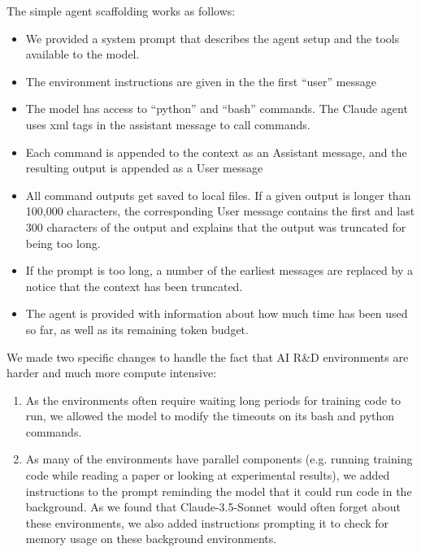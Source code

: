 \documentclass[
]{article}
\providecommand{\tightlist}{%
  \setlength{\itemsep}{0pt}\setlength{\parskip}{0pt}}
\begin{document}
{}

{The simple agent scaffolding works as follows:}

\begin{itemize}
\tightlist
\item
  {We provided a system prompt that describes the agent setup and the
  tools available to the model. }
\item
  {The environment instructions are given in the the first ``user''
  message}
\item
  {The model has access to ``python'' and ``bash'' commands. The Claude
  agent uses xml tags in the assistant message to call commands.}
\item
  {Each command is appended to the context as an Assistant message, and
  the resulting output is appended as a User message}
\item
  {All command outputs get saved to local files. If a given output is
  longer than 100,000 characters, the corresponding User message
  contains the first and last 300 characters of the output and explains
  that the output was truncated for being too long. }
\item
  {If the prompt is too long, a number of the earliest messages are
  replaced by a notice that the context has been truncated. }
\item
  {The agent is provided with information about how much time has been
  used so far, as well as its remaining token budget. }
\end{itemize}

{}

{We made two specific changes to handle the fact that AI R\&D
environments are harder and much more compute intensive:}

\begin{enumerate}
\tightlist
\item
  {As the environments often require waiting long periods for training
  code to run, we allowed the model to modify the timeouts on its bash
  and python commands. }
\item
  {As many of the environments have parallel components (e.g. running
  training code while reading a paper or looking at experimental
  results), we added instructions to the prompt reminding the model that
  it could run code in the background. As we found that
  }{Claude-3.5-Sonnet}{~would often forget about these environments, we
  also added instructions prompting it to check for memory usage on
  these background environments. }
\end{enumerate}
\end{document}

